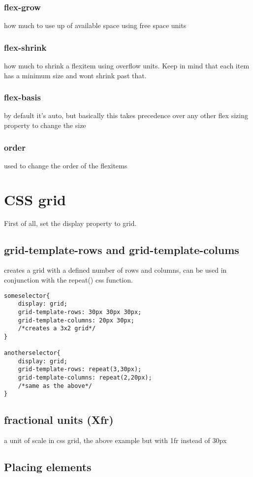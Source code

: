 \documentclass[11pt]{article}
\begin{document}
\subsubsection{flex-grow}
\label{sec:org86a9bde}
how much to use up of available space using free space units
\subsubsection{flex-shrink}
\label{sec:org0a8a1c2}
how much to shrink a flexitem using overflow units. Keep in mind that each item has a minimum size and wont shrink past that.
\subsubsection{flex-basis}
\label{sec:org57400d4}
by default it's auto, but basically this takes precedence over any other flex sizing property to change the size
\subsubsection{order}
\label{sec:org82a4485}
used to change the order of the flexitems
\section{CSS grid}
\label{sec:orgc554953}
First of all, set the display property to grid.
\subsection{grid-template-rows and grid-template-colums}
\label{sec:orgb206b60}
creates a grid with a defined number of rows and columns, can be used in conjunction with the repeat() css function.

\begin{verbatim}
someselector{
    display: grid;
    grid-template-rows: 30px 30px 30px;
    grid-template-columns: 20px 30px;
    /*creates a 3x2 grid*/
}

anotherselector{
    display: grid;
    grid-template-rows: repeat(3,30px);
    grid-template-columns: repeat(2,20px);
    /*same as the above*/
}
\end{verbatim}
\subsection{fractional units (Xfr)}
\label{sec:org033bbbe}
a unit of scale in css grid, the above example but with 1fr instead of 30px
\subsection{Placing elements}
\label{sec:org14943f6}
\end{document}
